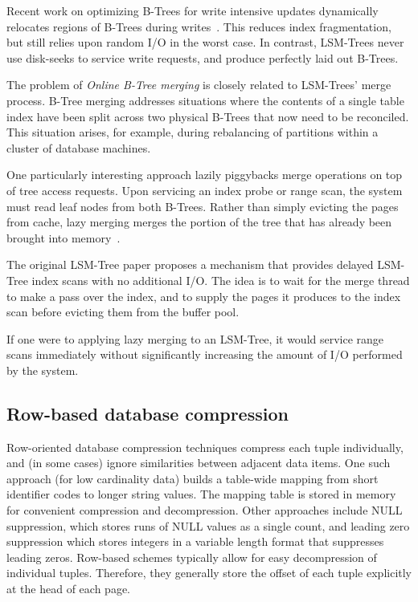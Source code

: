 \documentclass{sig-alternate-sigmod08}
\begin{document}
Recent work on optimizing B-Trees for write intensive updates dynamically
relocates regions of B-Trees during
writes~\cite{bTreeHighUpdateRates}.  This reduces index fragmentation,
but still relies upon random I/O in the worst case.  In contrast,
LSM-Trees never use disk-seeks to service write requests, and produce
perfectly laid out B-Trees.

The problem of {\em Online B-Tree merging} is closely related to
LSM-Trees' merge process.  B-Tree merging addresses situations where
the contents of a single table index have been split across two
physical B-Trees that now need to be reconciled.  This situation
arises, for example, during rebalancing of partitions within a cluster
of database machines.

One particularly interesting approach lazily piggybacks merge
operations on top of tree access requests.  Upon servicing an index
probe or range scan, the system must read leaf nodes from both B-Trees.
Rather than simply evicting the pages from cache, lazy merging merges
the portion of the tree that has already been brought into
memory~\cite{onlineMerging}.

The original LSM-Tree paper proposes a mechanism that provides delayed
LSM-Tree index scans with no additional I/O.  The idea is to wait for
the merge thread to make a pass over the index, and to supply the
pages it produces to the index scan before evicting them from the
buffer pool.

If one were to applying lazy merging to an LSM-Tree, it would service
range scans immediately without significantly increasing the amount of
I/O performed by the system.

\subsection{Row-based database compression}

Row-oriented database compression techniques compress each tuple
individually, and (in some cases) ignore similarities between adjacent
data items.  One such approach (for low cardinality data) builds a
table-wide mapping from short identifier codes to longer string
values. The mapping table is stored in memory for convenient
compression and decompression.  Other approaches include NULL
suppression, which stores runs of NULL values as a single count, and
leading zero suppression which stores integers in a variable length
format that suppresses leading zeros.  Row-based schemes typically
allow for easy decompression of individual tuples.  Therefore, they
generally store the offset of each tuple explicitly at the head of
each page.
\end{document}
